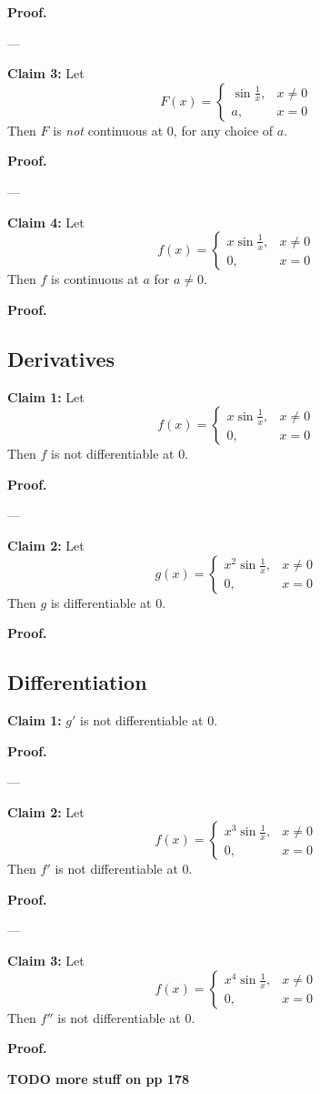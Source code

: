 \vs

\textbf{Proof.}

\vs---\vs

\textbf{Claim 3:} Let
\[F(x)=\begin{cases}
  \sin \frac{1}{x},&x\neq0\\
  a,&x=0
\end{cases}\]
Then $F$ is \textit{not} continuous at $0$, for any choice of $a$.

\vs

\textbf{Proof.}

\vs---\vs

\textbf{Claim 4:} Let
\[f(x)=\begin{cases}
  x\sin \frac{1}{x},&x\neq0\\
  0,&x=0
\end{cases}\]
Then $f$ is continuous at $a$ for $a\neq 0$.

\vs

\textbf{Proof.}


\subsection{Derivatives}

\textbf{Claim 1:} Let
\[f(x)=\begin{cases}
  x\sin \frac{1}{x},&x\neq0\\
  0,&x=0
\end{cases}\]
Then $f$ is not differentiable at $0$.

\vs

\textbf{Proof.}

\vs---\vs

\textbf{Claim 2:} Let
\[g(x)=\begin{cases}
  x^2\sin \frac{1}{x},&x\neq0\\
  0,&x=0
\end{cases}\]
Then $g$ is differentiable at $0$.

\vs

\textbf{Proof.}

\subsection{Differentiation}

\textbf{Claim 1:} $g'$ is not differentiable at $0$.

\textbf{Proof.}

\vs---\vs

\textbf{Claim 2:} Let
\[f(x)=\begin{cases}
  x^3\sin \frac{1}{x},&x\neq0\\
  0,&x=0
\end{cases}\]
Then $f'$ is not differentiable at $0$.

\vs

\textbf{Proof.}

\vs---\vs

\textbf{Claim 3:} Let
\[f(x)=\begin{cases}
  x^4\sin \frac{1}{x},&x\neq0\\
  0,&x=0
\end{cases}\]
Then $f''$ is not differentiable at $0$.

\vs

\textbf{Proof.}

\vs

\textbf{TODO more stuff on pp 178}

